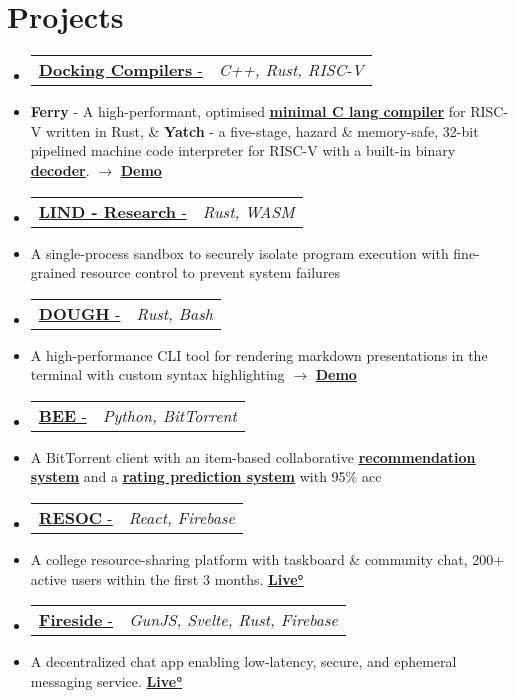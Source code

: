 \documentclass[letterpaper,10pt]{article}
\makeatletter
\newcommand{\resumeItem}[1]{
  \item\small{
    {#1 \vspace{-2pt}}
  }
}
\newcommand{\resumeProjectHeading}[2]{
    \item
    \begin{tabular*}{0.97\textwidth}{l@{\extracolsep{\fill}}r}
      \small#1 & \textit{\small #2} \\
    \end{tabular*}\vspace{-4 pt}
}
\newcommand{\resumeSubItem}[1]{\resumeItem{#1}\vspace{-4pt}}
\newcommand{\resumeSubHeadingListStart}{\begin{itemize}[leftmargin=0.15in, label={}]}
\newcommand{\resumeSubHeadingListEnd}{\end{itemize}}
\makeatother
\begin{document}
\section{Projects}
  \resumeSubHeadingListStart
  \resumeProjectHeading
  {\href{https://anubhavp.dev/blog/hacktoberfest}{\textbf{Docking Compilers} - \faIcon{link}}}{C++, Rust, RISC-V}
    \resumeSubItem
      {\textbf{Ferry} - A high-performant, optimised {\href{https://anubhavp.dev/blog/ferryman.html} {\underline{\textbf{minimal C lang compiler}}}} for RISC-V written in Rust, \& \textbf{Yatch} - a five-stage, hazard \& memory-safe, 32-bit pipelined machine code interpreter for RISC-V with a built-in binary {\href{https://anubhavp.dev/barney}{\underline{\textbf{decoder}}}}. $\rightarrow$ {\href{https://anubhavp.dev/blog/hacktoberfest.html}{\textbf{Demo}}}}
  \resumeProjectHeading
    {\href{https://github.com/Lind-Project/lind_project}{\textbf{LIND - Research} \text{/ Open Source Contribution} - \faIcon{link}}}{Rust, WASM}
    \resumeSubItem
      {A single-process sandbox to securely isolate program execution with fine-grained resource control to prevent system failures}
  \resumeProjectHeading
    {\href{https://github.com/anubhavpgit/dough}{\textbf{DOUGH} - \faIcon{link}}}{Rust, Bash}
    \resumeSubItem
      {A high-performance CLI tool for rendering markdown presentations in the terminal with custom syntax highlighting $\rightarrow$ {\href{https://anubhavp.dev/blog/dough.html}{\textbf{Demo}}}}
  \resumeProjectHeading
    {\href{https://github.com/anubhavpgit/b}{{\textbf{BEE} - \faIcon{link} }}}{Python, BitTorrent}
    \resumeSubItem
      {A BitTorrent client with an item-based collaborative \href{https://github.com/anubhavpgit/Movie-recommendation}{\underline{\textbf{recommendation system}}} and a \href{https://github.com/anubhavpgit/Movie-rating-prediction}{\underline{\textbf{rating prediction system}}} with 95\% acc}
  \resumeProjectHeading
    {\href{https://github.com/anubhavpgit/resoc}{\textbf{RESOC} - \faIcon{link} }}{React, Firebase}
    \resumeSubItem
      {A college resource-sharing platform with taskboard \& community chat, 200+ active users within the first 3 months. {\href{https://resoc.in}{\textbf{Live°}}}}
    \resumeProjectHeading
    {\href{https://github.com/anubhavpgit/w3bchat-dapp}{\textbf{Fireside} - \faIcon{link}}}{GunJS, Svelte, Rust, Firebase}
    \resumeSubItem
      {A decentralized chat app enabling low-latency, secure, and ephemeral messaging service. {\href{https://anubhavp.dev/fireside/}{\textbf{Live°}}}}
  \resumeSubHeadingListEnd
\end{document}
